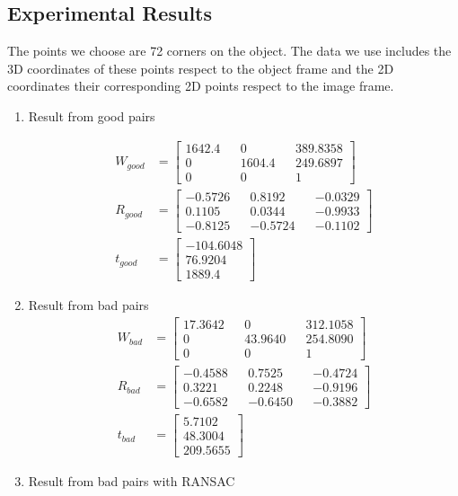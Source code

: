 \documentclass{article}
\begin{document}
\subsection*{Experimental Results}
The points we choose are 72 corners on the  object. The data we use includes the 3D coordinates of these points respect to the object frame and the 2D coordinates their corresponding 2D points respect to the image frame. 
\begin{enumerate}
\item Result from good pairs

\begin{align*}
W_{good}&=\begin{bmatrix}1642.4&&0&&389.8358\\0&&1604.4&&249.6897\\0&&0&&1\end{bmatrix}
\\R_{good}&=\begin{bmatrix}-0.5726&&0.8192&&-0.0329\\0.1105&&0.0344&&-0.9933\\-0.8125&&-0.5724&&-0.1102\end{bmatrix}
\\t_{good}&=\begin{bmatrix}-104.6048\\76.9204\\1889.4\end{bmatrix}
\end{align*}
\item Result from bad pairs
\begin{align*}
W_{bad}&=\begin{bmatrix}17.3642&&0&&312.1058\\0&&43.9640&&254.8090\\0&&0&&1\end{bmatrix}
\\R_{bad}&=\begin{bmatrix}-0.4588&&0.7525&&-0.4724\\0.3221&&0.2248&&-0.9196\\-0.6582&&-0.6450&&-0.3882\end{bmatrix}
\\t_{bad}&=\begin{bmatrix}5.7102\\48.3004\\209.5655\end{bmatrix}
\end{align*}
\item Result from bad pairs with RANSAC

\end{enumerate}
\end{document}
